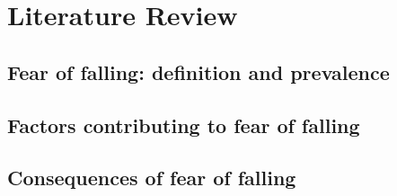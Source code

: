 \chapter{Literature Review}
    \section{Fear of falling: definition and prevalence}
    \section{Factors contributing to fear of falling}
    \section{Consequences of fear of falling}